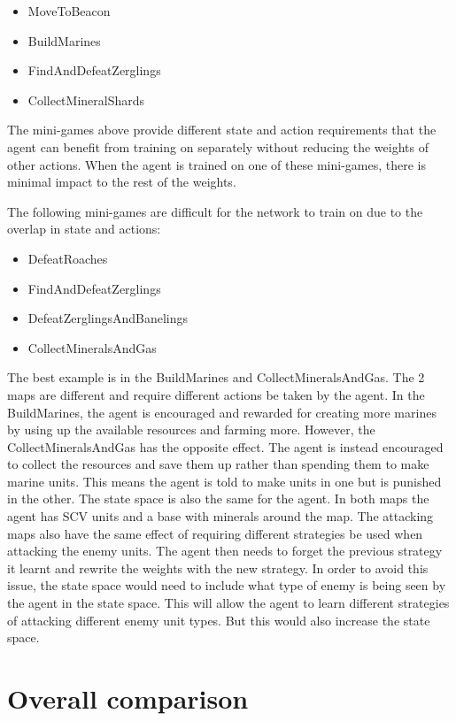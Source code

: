 \begin{itemize}
    \item MoveToBeacon
    \item BuildMarines
    \item FindAndDefeatZerglings
    \item CollectMineralShards
\end{itemize}

The mini-games above provide different state and action requirements that the
agent can benefit from training on separately without reducing the weights of
other actions. When the agent is trained on one of these mini-games, there is
minimal impact to the rest of the weights.

The following mini-games are difficult for the network to train on due to the
overlap in state and actions:

\begin{itemize}
    \item DefeatRoaches
    \item FindAndDefeatZerglings
    \item DefeatZerglingsAndBanelings
    \item CollectMineralsAndGas
\end{itemize}

The best example is in the BuildMarines and CollectMineralsAndGas. The 2 maps
are different and require different actions be taken by the agent. In the
BuildMarines, the agent is encouraged and rewarded for creating more marines by
using up the available resources and farming more. However, the
CollectMineralsAndGas has the opposite effect. The agent is instead encouraged
to collect the resources and save them up rather than spending them to make
marine units. This means the agent is told to make units in one but is punished
in the other. The state space is also the same for the agent. In both maps the
agent has SCV units and a base with minerals around the map. The attacking maps
also have the same effect of requiring different strategies be used when
attacking the enemy units. The agent then needs to forget the previous strategy
it learnt and rewrite the weights with the new strategy. In order to avoid this
issue, the state space would need to include what type of enemy is being seen by
the agent in the state space. This will allow the agent to learn different
strategies of attacking different enemy unit types. But this would also increase
the state space.

\section{Overall comparison}

